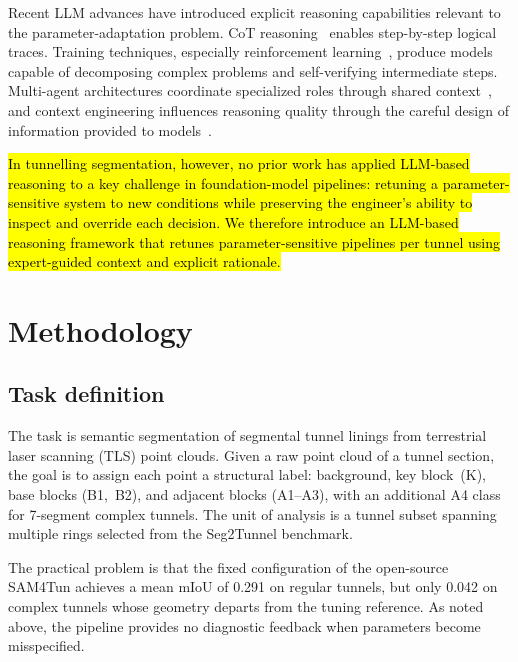 \documentclass[a4paper,fleqn]{cas-dc}
\begin{document}
Recent LLM advances have introduced explicit reasoning capabilities relevant to the parameter-adaptation problem. CoT reasoning~\cite{wei2023cot} enables step-by-step logical traces. Training techniques, especially reinforcement learning~\cite{deepseek2025analysis, openai2025o3, xiang2025metacot}, produce models capable of decomposing complex problems and self-verifying intermediate steps. Multi-agent architectures coordinate specialized roles through shared context~\cite{hong2024metagpt, qian2024chatdev, chen2024comm}, and context engineering influences reasoning quality through the careful design of information provided to models~\cite{xu2024retrieval, mei2025survey}.

\hl{In tunnelling segmentation, however, no prior work has applied LLM-based reasoning to a key challenge in foundation-model pipelines: retuning a parameter-sensitive system to new conditions while preserving the engineer's ability to inspect and override each decision. We therefore introduce an LLM-based reasoning framework that retunes parameter-sensitive pipelines per tunnel using expert-guided context and explicit rationale.}


\section{Methodology}\label{sec:methods}

\subsection{Task definition}\label{sec:problem-def}

The task is semantic segmentation of segmental tunnel linings from terrestrial laser scanning (TLS) point clouds. Given a raw point cloud of a tunnel section, the goal is to assign each point a structural label: background, key block~(K), base blocks (B1,~B2), and adjacent blocks (A1--A3), with an additional A4 class for 7-segment complex tunnels. The unit of analysis is a tunnel subset spanning multiple rings selected from the Seg2Tunnel benchmark. 

The practical problem is that the fixed configuration of the open-source SAM4Tun achieves a mean mIoU of 0.291 on regular tunnels, but only 0.042 on complex tunnels whose geometry departs from the tuning reference. As noted above, the pipeline provides no diagnostic feedback when parameters become misspecified.
\end{document}
